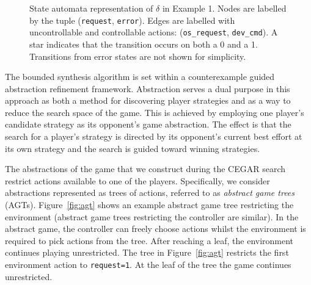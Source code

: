 \begin{figure}
    \centering
    \label{fig:example1}
    \caption{State automata representation of $\delta$ in Example 1. Nodes are labelled by the tuple (\texttt{request}, \texttt{error}). Edges are labelled with uncontrollable and controllable actions: (\texttt{os\_request}, \texttt{dev\_cmd}). A star indicates that the transition occurs on both a 0 and a 1. Transitions from error states are not shown for simplicity.}
\end{figure}

The bounded synthesis algorithm is set within a counterexample guided abstraction refinement framework. Abstraction serves a dual purpose in this approach as both a method for discovering player strategies and as a way to reduce the search space of the game. This is achieved by employing one player's candidate strategy as its opponent's game abstraction. The effect is that the search for a player's strategy is directed by its opponent's current best effort at its own strategy and the search is guided toward winning strategies.

The abstractions of the game that we construct during the CEGAR search restrict actions available to one of the players.  Specifically, we consider abstractions represented as trees of actions, referred to as \emph{abstract game trees} (AGTs).  Figure~\ref{fig:agt} shows an example abstract game tree restricting the environment (abstract game trees restricting the controller are similar).  In the abstract game, the controller can freely choose actions whilst the environment is required to pick actions from the tree.  After reaching a leaf, the environment continues playing unrestricted.  The tree in Figure~\ref{fig:agt} restricts the first environment action to \texttt{request=1}. At the leaf of the tree the game continues unrestricted.

